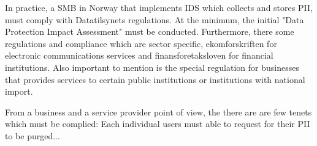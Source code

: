 In practice, a SMB in Norway that implements IDS which collects and stores PII, must comply with Datatilsynets regulations. At the minimum, the initial "Data Protection Impact Assessment" must be conducted. Furthermore, there some regulations and compliance which are sector specific, ekomforskriften for electronic communications services \cite{Lovdata2021_ekomforskriften} and finansforetaksloven \cite{Lovdata2016_finansforetaksloven} for financial institutions. Also important to mention is the special
regulation \cite{Lovdata2018_Sikkerhetsloven} for businesses that provides services to certain public institutions or institutions with national import.

From a business and a service provider point of view, the there are are few tenets which must be complied: Each individual users must able to request for their PII to be purged...